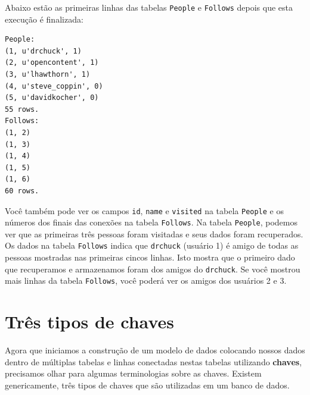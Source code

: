 Abaixo estão as primeiras linhas das tabelas {\tt People} e {\tt Follows}
depois que esta execução é finalizada:

\beforeverb
\begin{verbatim}
People:
(1, u'drchuck', 1)
(2, u'opencontent', 1)
(3, u'lhawthorn', 1)
(4, u'steve_coppin', 0)
(5, u'davidkocher', 0)
55 rows.
Follows:
(1, 2)
(1, 3)
(1, 4)
(1, 5)
(1, 6)
60 rows.
\end{verbatim}
\afterverb
%

%
Você também pode ver os campos {\tt id}, {\tt name} e {\tt visited} na tabela
{\tt People} e os números dos finais das conexões na tabela {\tt Follows}. Na
tabela {\tt People}, podemos ver que as primeiras três pessoas foram visitadas
e seus dados foram recuperados. Os dados na tabela {\tt Follows} indica que
{\tt drchuck} (usuário 1) é amigo de todas as pessoas mostradas nas primeiras
cincos linhas. Isto mostra que o primeiro dado que recuperamos e armazenamos
foram dos amigos do {\tt drchuck}. Se você mostrou mais linhas da tabela
{\tt Follows}, você poderá ver os amigos dos usuários 2 e 3.

\section{Três tipos de chaves}


Agora que iniciamos a construção de um modelo de dados colocando nossos dados
dentro de múltiplas tabelas e linhas conectadas nestas tabelas utilizando
{\bf chaves}, precisamos olhar para algumas terminologias sobre as chaves.
Existem genericamente, três tipos de chaves que são utilizadas em um banco de
dados.

